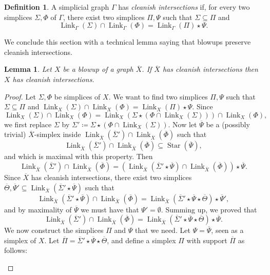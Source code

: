 \documentclass[svgnames]{amsart}
\theoremstyle{plain}
\newtheorem{lem}[thm]{Lemma}
\theoremstyle{definition}
\newtheorem{defn}[thm]{Definition}
\newcommand{\link}[2]{\operatorname{Link}_{#1}\left(#2\right)}
\newcommand{\CStar}[1]{\operatorname{Star}\left(#1\right)}
\newcommand{\ov}[1]{\overline{#1}}
\begin{document}
\newcommand{\cleanish}[1]{cleanish intersections}
\begin{defn}
    A simplicial graph $\Gamma$ has \emph{\cleanish{}} if, for every two simplices $\Sigma,\Phi$ of $\Gamma$, there exist two simplices $\Pi,\Psi$ such that $\Sigma\subseteq \Pi$ and 
    $$\link{\Gamma}{\Sigma}\cap \link{\Gamma}{\Phi}=\link{\Gamma}{\Pi}\star \Psi.$$
\end{defn}

\noindent We conclude this section with a technical lemma saying that blowups preserve \cleanish{}.
\begin{lem}\label{lem:cleanish_for_blowup}
    Let $X$ be a blowup of a graph $\ov X$. If $\ov X$ has \cleanish{} then $X$ has \cleanish{}.
\end{lem}

\begin{proof}
    Let $\Sigma, \Phi$ be simplices of $X$. We want to find two simplices $\Pi,\Psi$ such that $\Sigma\subseteq \Pi$ and
    $\link{X}{\Sigma}\cap \link{X}{\Phi}=\link{X}{\Pi}\star \Psi$. 
    Since $$\link{X}{\Sigma}\cap \link{X}{\Phi}=\link{X}{\Sigma\star(\Phi\cap\link{X}{\Sigma})}\cap \link{X}{\Phi},$$ 
    we first replace $\Sigma$ by $\Sigma'\coloneq \Sigma\star(\Phi\cap\link{X}{\Sigma})$. Now let $\ov\Psi$ be a (possibly trivial) $\ov X$-simplex inside $\link{\ov X}{\ov\Sigma'}\cap \link{\ov X}{\ov\Phi}$ such that $$\link{\ov X}{\ov \Sigma'}\cap \link{\ov X}{\ov \Phi}\subseteq \CStar{\ov \Psi},$$
    and which is maximal with this property. Then
    $$\link{\ov X}{\ov \Sigma'}\cap \link{\ov X}{\ov \Phi}=\left( \link{\ov X}{\ov \Sigma'\star\ov\Psi}\cap \link{\ov X}{\ov \Phi}\right)\star\ov\Psi.$$
    Since $\ov X$ has \cleanish{}, there exist two simplices $\ov\Theta,\ov\Psi'\subseteq \link{\ov X}{\ov\Sigma'\star\ov \Psi}$ such that 
    $$\link{\ov X}{\ov \Sigma'\star\ov\Psi}\cap \link{\ov X}{\ov \Phi}=\link{\ov X}{\ov \Sigma'\star\ov\Psi\star\ov \Theta}\star\ov \Psi',$$
    and by maximality of $\ov\Psi$ we must have that $\Psi'=\emptyset$. Summing up, we proved that
    \begin{equation}\label{eq:lk_cap_lk_in_ovX}
        \link{\ov X}{\ov \Sigma'}\cap \link{\ov X}{\ov \Phi}=\link{\ov X}{\ov \Sigma'\star\ov\Psi\star\ov\Theta}\star\ov\Psi.
    \end{equation}
    We now construct the simplices $\Pi$ and $\Psi$ that we need. Let $\Psi=\ov\Psi$, seen as a simplex of $X$. Let $\ov\Pi=\ov \Sigma'\star\ov\Psi\star\ov\Theta$, and define a simplex $\Pi$ with support $\ov\Pi$ as follows:
    \begin{itemize}

\end{itemize}
\end{proof}
\end{document}
